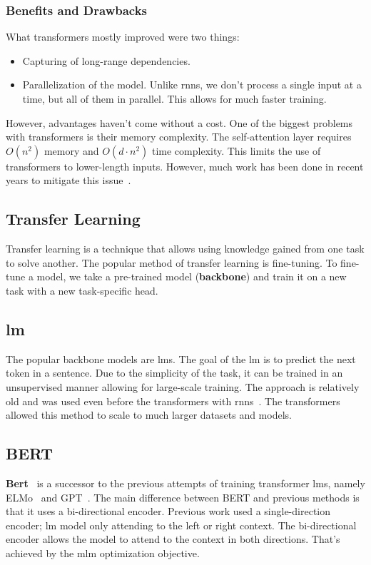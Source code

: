 \subsubsection{Benefits and Drawbacks}
\label{sec:benefits-and-drawbacks}
What transformers mostly improved were two things:
\begin{itemize}
    \item Capturing of long-range dependencies.
    \item Parallelization of the model. Unlike \acp{rnn}, we don't process a single input at a time,
          but all of them in parallel. This allows for much faster training.
\end{itemize}
However, advantages haven't come without a cost. One of the biggest problems with transformers
is their memory complexity. The self-attention layer requires $O(n^2)$ memory and $O(d \cdot n^2)$ time complexity.
This limits the use of transformers to lower-length inputs. However, much work has been done in recent years to mitigate this issue~\parencite{zhuangSurveyEfficientTraining2023}.

\subsection{Transfer Learning}
\label{sec:transfer-learning}
Transfer learning is a technique that allows using knowledge gained from one task to solve another.
The popular method of transfer learning is fine-tuning. To fine-tune a model, we take a pre-trained model (\textbf{backbone})
and train it on a new task with a new task-specific head.

\subsection{\acl{lm}}
The popular backbone models are \acfp{lm}. The goal of the \ac{lm} is to predict the next token in a sentence.
Due to the simplicity of the task, it can be trained in an unsupervised manner allowing for large-scale training.
The approach is relatively old and was used even before the transformers with \acp{rnn}~\parencites{daiSemisupervisedSequenceLearning2015}{petersSemisupervisedSequenceTagging2017}.
The transformers allowed this method to scale to much larger datasets and models.

\subsection{BERT}
\textbf{Bert}~\parencite{devlinBERTPretrainingDeep2019a} is a successor to the previous attempts of training transformer \acp{lm}, namely ELMo~\parencite{petersDeepContextualizedWord2018} and GPT~\parencite{howardUniversalLanguageModel2018a}.
The main difference between BERT and previous methods is that it uses a bi-directional encoder.
Previous work used a single-direction encoder; \ac{lm} model only attending to the left or right context.
The bi-directional encoder allows the model to attend to the context in both directions.
That's achieved by the \acf{mlm} optimization objective.

